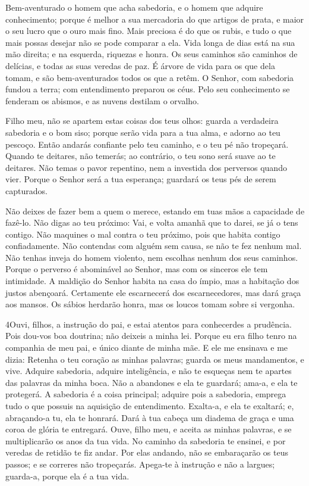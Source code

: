 Bem-aventurado o homem que acha sabedoria, e o homem que adquire
conhecimento; porque é melhor a sua mercadoria do que artigos
de prata, e maior o seu lucro que o ouro mais fino. Mais
preciosa é do que os rubis, e tudo o que mais possas desejar não se
pode comparar a ela. Vida longa de dias está na sua mão
direita; e na esquerda, riquezas e honra. Os seus caminhos
são caminhos de delícias, e todas as suas veredas de paz. É
árvore de vida para os que dela tomam, e são bem-aventurados todos
os que a retêm. O Senhor, com sabedoria fundou a terra; com
entendimento preparou os céus. Pelo seu conhecimento se
fenderam os abismos, e as nuvens destilam o orvalho.

Filho meu, não se apartem estas coisas dos teus olhos: guarda a
verdadeira sabedoria e o bom siso; porque serão vida para a
tua alma, e adorno ao teu pescoço. Então andarás confiante
pelo teu caminho, e o teu pé não tropeçará. Quando te
deitares, não temerás; ao contrário, o teu sono será suave ao te
deitares. Não temas o pavor repentino, nem a investida dos
perversos quando vier. Porque o Senhor será a tua esperança;
guardará os teus pés de serem capturados.

Não deixes de fazer bem a quem o merece, estando em tuas mãos a
capacidade de fazê-lo. Não digas ao teu próximo: Vai, e volta
amanhã que to darei, se já o tens contigo. Não maquines o mal
contra o teu próximo, pois que habita contigo confiadamente.
Não contendas com alguém sem causa, se não te fez nenhum mal.
Não tenhas inveja do homem violento, nem escolhas nenhum dos
seus caminhos. Porque o perverso é abominável ao Senhor, mas
com os sinceros ele tem intimidade. A maldição do Senhor
habita na casa do ímpio, mas a habitação dos justos abençoará.
Certamente ele escarnecerá dos escarnecedores, mas dará graça
aos mansos. Os sábios herdarão honra, mas os loucos tomam
sobre si vergonha.

\medskip

\lettrine{4}{}Ouvi, filhos, a instrução do pai, e estai atentos
para conhecerdes a prudência. Pois dou-vos boa doutrina; não
deixeis a minha lei. Porque eu era filho tenro na companhia de
meu pai, e único diante de minha mãe. E ele me ensinava e me
dizia: Retenha o teu coração as minhas palavras; guarda os meus
mandamentos, e vive. Adquire sabedoria, adquire inteligência, e
não te esqueças nem te apartes das palavras da minha boca. Não a
abandones e ela te guardará; ama-a, e ela te protegerá. A
sabedoria é a coisa principal; adquire pois a sabedoria, emprega
tudo o que possuis na aquisição de entendimento. Exalta-a, e ela
te exaltará; e, abraçando-a tu, ela te honrará. Dará à tua
cabeça um diadema de graça e uma coroa de glória te entregará.
Ouve, filho meu, e aceita as minhas palavras, e se
multiplicarão os anos da tua vida. No caminho da sabedoria te
ensinei, e por veredas de retidão te fiz andar. Por elas
andando, não se embaraçarão os teus passos; e se correres não
tropeçarás. Apega-te à instrução e não a largues; guarda-a,
porque ela é a tua vida.

